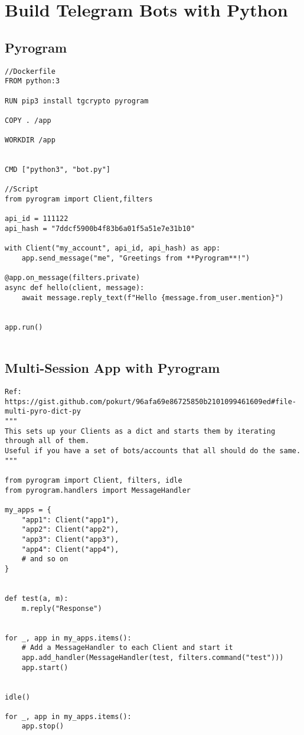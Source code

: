 \documentclass{article}
\begin{document}
\section{Build Telegram Bots with Python}
\subsection{Pyrogram}
\begin{verbatim}
//Dockerfile
FROM python:3

RUN pip3 install tgcrypto pyrogram

COPY . /app

WORKDIR /app


CMD ["python3", "bot.py"]

//Script
from pyrogram import Client,filters

api_id = 111122
api_hash = "7ddcf5900b4f83b6a01f5a51e7e31b10"

with Client("my_account", api_id, api_hash) as app:
    app.send_message("me", "Greetings from **Pyrogram**!")

@app.on_message(filters.private)
async def hello(client, message):
    await message.reply_text(f"Hello {message.from_user.mention}")


app.run()


\end{verbatim}

\subsection{Multi-Session App with Pyrogram}
\begin{lstlisting}
Ref: https://gist.github.com/pokurt/96afa69e86725850b2101099461609ed#file-multi-pyro-dict-py
"""
This sets up your Clients as a dict and starts them by iterating through all of them.
Useful if you have a set of bots/accounts that all should do the same.
"""

from pyrogram import Client, filters, idle
from pyrogram.handlers import MessageHandler

my_apps = {
    "app1": Client("app1"),
    "app2": Client("app2"),
    "app3": Client("app3"),
    "app4": Client("app4"),
    # and so on
}


def test(a, m):
    m.reply("Response")


for _, app in my_apps.items():
    # Add a MessageHandler to each Client and start it
    app.add_handler(MessageHandler(test, filters.command("test")))
    app.start()


idle()

for _, app in my_apps.items():
    app.stop()
\end{lstlisting}
\end{document}
